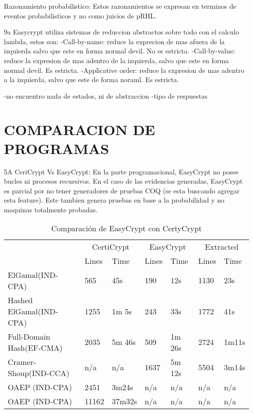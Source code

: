\documentclass[runningheads,a4paper]{llncs}
\begin{document}
Razonamiento probabilistico:
Estos razonamientos se expresan en terminos de eventos probabilisticos y no como juicios de pRHL.

9a
\cite{article6}
Easycrypt utiliza sistemas de reduccion abstractos sobre todo con el calculo lambda, estos son:
	-Call-by-name: reduce la exprecion de mas afuera de la izquierda salvo que este en forma normal devil. No es estricta.
	-Call-by-value: reduce la expresion de mas adentro de la izquierda, salvo que este en forma normal devil. Es estricta.
	-Applicative order: reduce la expresion de mas adentro a la izquierda, salvo que este de forma noraml. Es estricta.



-no encuentro nada de estados, ni de abstraccion
-tipo de respuestas


\section{COMPARACION DE PROGRAMAS}
5A
\cite{article5}
CeriCrypt Vs EasyCrypt:
En la parte programacional, EasyCrypt no posee bucles ni procesos recursivos. En el caso de las evidencias generadas, EasyCrypt es parcial por no tener generadores de pruebas COQ (se esta buscando agregar esta feature). Este tambien genera pruebas en base a la probabilidad y no maquinas totalmente probadas.

\begin{table}
  \caption{Comparación de EasyCrypt con CertyCrypt}
  \label{tab:simple1}
  \centering
  \begin{tabular}{ |p{3.5cm}|p{1.5cm}|p{1.5cm}|p{1.5cm}|p{1.5cm}|p{1.5cm}|p{1.5cm}|  }
 \hline
 & \multicolumn{2}{|c|}{CertiCrypt} & \multicolumn{2}{|c|}{EasyCrypt} & \multicolumn{2}{|c|}{Extracted} \\\cline{2-7}

 &Lines&Time&Lines&Time&Lines&Time\\\cline{2-7}
 \hline
 ElGamal(IND-CPA) & 565 & 45s & 190 & 12s & 1130 & 23s\\
 Hashed ElGamal(IND-CPA) & 1255  & 1m 5s & 243  & 33s & 1772 & 41s\\
 Full-Domain Hash(EF-CMA) & 2035 & 5m 46s&  509 & 1m 26s & 2724 & 1m11s\\
 Cramer-Shoup(IND-CCA) & n/a & n/a & 1637 & 5m 12s & 5504 & 3m14s\\
 OAEP (IND-CPA) & 2451 & 3m24s & n/a & n/a & n/a & n/a\\
 OAEP (IND-CPA) & 11162 & 37m32s & n/a & n/a & n/a & n/a\\
 \hline
\end{tabular}
\end{table}
\end{document}
